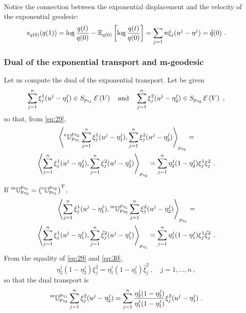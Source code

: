 \documentclass[12pt,a4paper]{amsart}
\begin{document}
Notice the connection between the exponential displacement and the velocity of the exponential geodesic:
\begin{equation}
  \label{eq:51}
  s_{q(0)}(q(1)) = \log \frac {q(t)}{q(0)} - \expectat {q(0)} {\log \frac {q(t)}{q(0)}} = \sum_{j=1}n \xi_j(u^j - \eta^j) = \velocity q(0) \ .
\end{equation}

\subsubsection{Dual of the exponential transport and m-geodesic}
\label{sec:dual-expon-transp}
Let us compute the dual of the exponential transport. Let be given
\begin{equation}
  \label{eq:38}
  \sum_{j=1}^n \xi_j^1(u^j - \eta^j_1) \in \expfibreat {p_{\eta_1}} V \quad \text{and} \quad \sum_{j=1}^n \xi_j^2(u^j - \eta^j_2) \in \expfibreat {p_{\eta_2}} V \ ,
\end{equation}
so that, from \cref{eq:29},
\begin{multline}
  \label{eq:39}
  \scalarat {p_{\eta_2}} {\etransport {p_{\eta_1}} {p_{\eta_2}}  \sum_{j=1}^n \xi_j^1(u^j - \eta^j_1)} {\sum_{j=1}^n \xi_j^2(u^j - \eta^j_2)} = \\
   \scalarat {p_{\eta_2}} {\sum_{j=1}^n \xi_j^1(u^j - \eta^j_2)} {\sum_{j=1}^n \xi_j^2(u^j - \eta^j_2)} = 
   \sum_{j=1}^n \eta^j_2(1-\eta^j_2) \xi_j^1 \xi_j^2 \ . 
 \end{multline}

If $\prescript{\text{m}}{} {\mathbb U} _ {p_{\eta_2}} ^ {p_{\eta_1}} = \left(\prescript{\text{e}}{} {\mathbb U} _ {p_{\eta_1}} ^ {p_{\eta_2}}\right)^T$,
\begin{multline}
  \label{eq:39a}
  \scalarat {p_{\eta_1}} {\sum_{j=1}^n \xi_j^1(u^j - \eta^j_1)} {\mtransport {p_{\eta_2}} {p_{\eta_1}}\sum_{j=1}^n \xi_j^2(u^j - \eta^j_2)} = \\
   \scalarat {p_{\eta_1}} {\sum_{j=1}^n \xi_j^1(u^j - \eta^j_1)} {\sum_{j=1}^n \hat \xi_j^2(u^j - \eta^j_1)} = 
   \sum_{j=1}^n \eta^j_1(1-\eta^j_1) \xi_j^1 \hat \xi_j^2 \ . 
\end{multline}
From the equality of \cref{eq:29} and \cref{eq:30},
\begin{equation}
\eta^j_2(1-\eta^j_2) \xi_j^2 = \eta^j_1(1-\eta^j_1) \hat \xi_j^2 \ , \quad j=1,\dots,n \ ,
\end{equation}
so that the dual transport is
\begin{equation}
  \label{eq:39b}
\mtransport {p_{\eta_2}} {p_{\eta_1}} \sum_{j=1}^n \xi_j^2(u^j - \eta^j_2) = 
\sum_{j=1}^n \frac{\eta^j_2(1-\eta^j_2)} {\eta^j_1(1-\eta^j_1)} \xi_j^2 (u^j - \eta^j_1) \ .
\end{equation}
\end{document}
